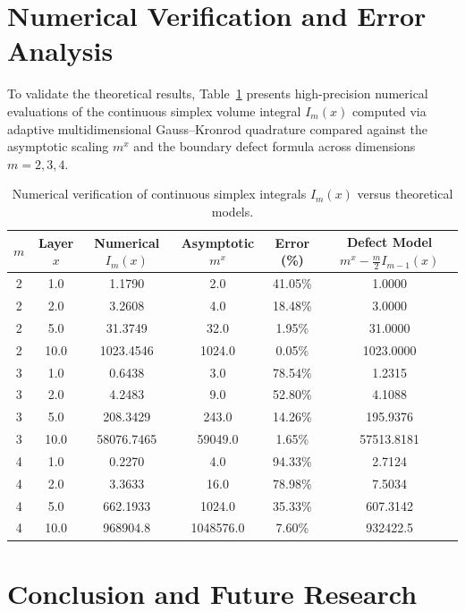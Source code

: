 \documentclass[11pt,a4paper]{article}
\theoremstyle{plain}
\theoremstyle{definition}
\theoremstyle{remark}
\numberwithin{equation}{section}
\begin{document}
\section{Numerical Verification and Error Analysis}

To validate the theoretical results, Table~\ref{tab:numerical_verification} presents high-precision numerical evaluations of the continuous simplex volume integral $I_m(x)$ computed via adaptive multidimensional Gauss--Kronrod quadrature compared against the asymptotic scaling $m^x$ and the boundary defect formula across dimensions $m=2, 3, 4$.

\begin{table}[htbp]
\centering
\small
\caption{Numerical verification of continuous simplex integrals $I_m(x)$ versus theoretical models.}
\label{tab:numerical_verification}
\begin{tabular}{cccccc}
\toprule
$m$ & Layer $x$ & Numerical $I_m(x)$ & Asymptotic $m^x$ & Error (\%) & Defect Model $m^x - \frac{m}{2}I_{m-1}(x)$ \\
\midrule
2 & 1.0 & 1.1790 & 2.0 & 41.05\% & 1.0000 \\
2 & 2.0 & 3.2608 & 4.0 & 18.48\% & 3.0000 \\
2 & 5.0 & 31.3749 & 32.0 & 1.95\% & 31.0000 \\
2 & 10.0 & 1023.4546 & 1024.0 & 0.05\% & 1023.0000 \\
\midrule
3 & 1.0 & 0.6438 & 3.0 & 78.54\% & 1.2315 \\
3 & 2.0 & 4.2483 & 9.0 & 52.80\% & 4.1088 \\
3 & 5.0 & 208.3429 & 243.0 & 14.26\% & 195.9376 \\
3 & 10.0 & 58076.7465 & 59049.0 & 1.65\% & 57513.8181 \\
\midrule
4 & 1.0 & 0.2270 & 4.0 & 94.33\% & 2.7124 \\
4 & 2.0 & 3.3633 & 16.0 & 78.98\% & 7.5034 \\
4 & 5.0 & 662.1933 & 1024.0 & 35.33\% & 607.3142 \\
4 & 10.0 & 968904.8 & 1048576.0 & 7.60\% & 932422.5 \\
\bottomrule
\end{tabular}
\end{table}

\section{Conclusion and Future Research}
\end{document}
